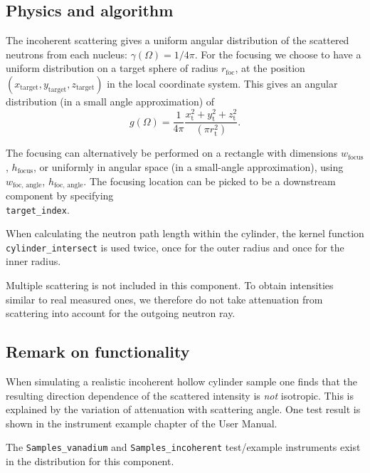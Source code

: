 \subsection{Physics and algorithm}

The incoherent scattering gives
a uniform angular distribution of the scattered
neutrons from each nucleus: $\gamma(\Omega) = 1/4\pi$.
For the focusing we choose to have a uniform distribution on
a target sphere of radius $r_\textrm{foc}$, at the position
$(x_\textrm{target},y_\textrm{target},z_\textrm{target})$
in the local coordinate system.
This gives an angular distribution (in a small angle approximation)
of
\begin{equation}
g(\Omega) = \frac{1}{4\pi}
  \frac{x_\textrm{t}^2+y_\textrm{t}^2+z_\textrm{t}^2}{(\pi r_\textrm{t}^2)}.
\end{equation}

The focusing can alternatively be performed on a rectangle with dimensions
$w_\textrm{focus}$, $h_\textrm{focus}$, or uniformly in angular space
(in a small-angle approximation),
using $w_\textrm{foc, angle}$, $h_\textrm{foc, angle}$.
The focusing location can be picked to be a downstream component by
specifying \\
\verb+target_index+.

When calculating the neutron path length within
the cylinder, the kernel function \\
\verb+cylinder_intersect+
is used twice, once for the outer radius and once
for the inner radius.

Multiple scattering is not included in this component. To obtain
intensities similar to real measured ones, we therefore do not
take attenuation from scattering into account for the outgoing
neutron ray.

\subsection{Remark on functionality}
When simulating a realistic incoherent hollow cylinder sample
one finds that  the resulting direction dependence
of the scattered intensity is {\em not} isotropic.
This is explained by the variation of attenuation with
scattering angle.
One test result is shown in the instrument example chapter of the \MCS User Manual.

The \verb+Samples_vanadium+ and \verb+Samples_incoherent+ test/example instruments exist in the distribution for this component.
